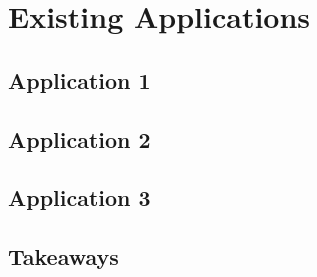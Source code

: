 \section{Existing Applications}

\subsection{Application 1}

\subsection{Application 2}

\subsection{Application 3}

\subsection{Takeaways}

